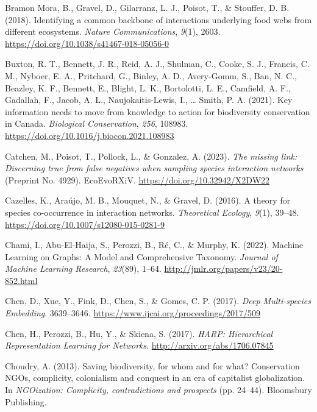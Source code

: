 \documentclass[11pt]{article}
\newlength{\cslhangindent}
\newenvironment{CSLReferences}[2] %
 {%
  \setlength{\parindent}{0pt}
  \ifodd #1 \everypar{\setlength{\hangindent}{\cslhangindent}}\ignorespaces\fi
  \ifnum #2 > 0
  \setlength{\parskip}{#2\baselineskip}
  \fi
 }%
 {}
\begin{document}
\begin{CSLReferences}{1}{0}
\leavevmode{}%
Bramon Mora, B., Gravel, D., Gilarranz, L. J., Poisot, T., \& Stouffer,
D. B. (2018). Identifying a common backbone of interactions underlying
food webs from different ecosystems. \emph{Nature Communications},
\emph{9}(1), 2603. \url{https://doi.org/10.1038/s41467-018-05056-0}

\leavevmode{}%
Buxton, R. T., Bennett, J. R., Reid, A. J., Shulman, C., Cooke, S. J.,
Francis, C. M., Nyboer, E. A., Pritchard, G., Binley, A. D., Avery-Gomm,
S., Ban, N. C., Beazley, K. F., Bennett, E., Blight, L. K., Bortolotti,
L. E., Camfield, A. F., Gadallah, F., Jacob, A. L., Naujokaitis-Lewis,
I., \ldots{} Smith, P. A. (2021). Key information needs to move from
knowledge to action for biodiversity conservation in Canada.
\emph{Biological Conservation}, \emph{256}, 108983.
\url{https://doi.org/10.1016/j.biocon.2021.108983}

\leavevmode{}%
Catchen, M., Poisot, T., Pollock, L., \& Gonzalez, A. (2023). \emph{The
missing link: Discerning true from false negatives when sampling species
interaction networks} (Preprint No. 4929). EcoEvoRXiV.
\url{https://doi.org/10.32942/X2DW22}

\leavevmode{}%
Cazelles, K., Araújo, M. B., Mouquet, N., \& Gravel, D. (2016). A theory
for species co-occurrence in interaction networks. \emph{Theoretical
Ecology}, \emph{9}(1), 39--48.
\url{https://doi.org/10.1007/s12080-015-0281-9}

\leavevmode{}%
Chami, I., Abu-El-Haija, S., Perozzi, B., Ré, C., \& Murphy, K. (2022).
Machine Learning on Graphs: A Model and Comprehensive Taxonomy.
\emph{Journal of Machine Learning Research}, \emph{23}(89), 1--64.
\url{http://jmlr.org/papers/v23/20-852.html}

\leavevmode{}%
Chen, D., Xue, Y., Fink, D., Chen, S., \& Gomes, C. P. (2017).
\emph{Deep Multi-species Embedding}. 3639--3646.
\url{https://www.ijcai.org/proceedings/2017/509}

\leavevmode{}%
Chen, H., Perozzi, B., Hu, Y., \& Skiena, S. (2017). \emph{HARP:
Hierarchical Representation Learning for Networks}.
\url{http://arxiv.org/abs/1706.07845}

\leavevmode{}%
Choudry, A. (2013). Saving biodiversity, for whom and for what?
Conservation NGOs, complicity, colonialism and conquest in an era of
capitalist globalization. In \emph{NGOization: Complicity,
contradictions and prospects} (pp. 24--44). Bloomsbury Publishing.


\end{CSLReferences}
\end{document}

